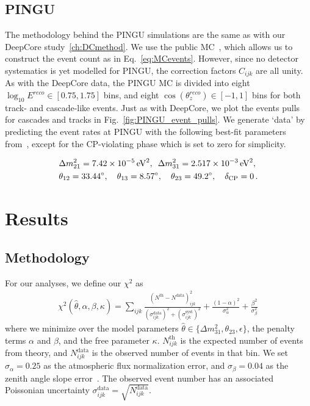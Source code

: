 \documentclass[draft=True]{revtex4-2}
\newcommand{\zreco}{\ensuremath{\cos{(\theta_z^{reco})}}}
\newcommand{\dm}{\Delta m^2_{31}}
\begin{document}
\subsection{PINGU}\label{ch:PINGUmethod}
The methodology behind the PINGU simulations are the same as with our DeepCore study~\ref{ch:DCmethod}. We use the public MC~\cite{PINGUdata}, which allows us to construct the event count as in Eq.~\ref{eq:MCevents}.
However, since no detector systematics is yet modelled for PINGU, the correction factors $C_{ijk}$ are all unity.
As with the DeepCore data, the PINGU MC is divided into eight 
$\log_{10}E^{reco} \in [0.75,1.75]$ bins, and eight $\zreco \in [-1,1]$ bins for both track- and cascade-like events. Just as with DeepCore, 
we plot the events pulls for cascades and tracks in Fig.~\ref{fig:PINGU_event_pulls}. %
We generate `data' by predicting the event rates at PINGU with the following best-fit parameters from~\cite{nufit}, except for the CP-violating phase which is set to zero for simplicity.

\begin{align}\label{eq:PINGUparams}
    &\Delta m^2_{21} =  \SI{7.42e-5}{\electronvolt^2},\hspace{0.5em} \dm =  \SI{2.517e-3}{\electronvolt^2}, \nonumber \\
    &\theta_{12} = \SI{33.44}{\degree},\hspace{1em} \theta_{13} = \SI{8.57}{\degree},\hspace{1em} \theta_{23} = \SI{49.2}{\degree}, \hspace{1em} \delta_\text{CP} = 0\,.
\end{align}


\section{Results}
\subsection{Methodology}
For our analyses, we define our $\chi^2$ as
\begin{align} \label{eq:chisq}
    \chi^{2}(\hat{\theta},\alpha,\beta, \kappa)=\sum_{ijk} \frac{\left(N^\text{th}-N^\text{data}\right)_{ijk}^{2}}
    {\left(\sigma^\text{data}_{ijk}\right)^{2} + \left(\sigma^\text{syst}_{ijk}\right)^{2}}+ 
    \frac{(1-\alpha)^2}{\sigma_\alpha^2} + \frac{\beta^2}{\sigma_\beta^2}\,
\end{align}
where we minimize over the model parameters $\hat{\theta} \in \{\dm, \theta_{23}, \epsilon\}$, the penalty terms $\alpha$ and $\beta$, and the free parameter $\kappa$.
$N_{ijk}^\text{th}$ is the expected number of events from theory, and $N_{ijk}^\text{data}$ is the observed number of events in that bin. We set $\sigma_\alpha = 0.25$ as the atmospheric flux normalization error, and $\sigma_\beta = 0.04$ as the zenith angle slope error~\cite{hondapaper}. 
The observed event number has an associated Poissonian uncertainty $\sigma_{ijk}^\text{data} = \sqrt{N_{ijk}^\text{data}}$.
\end{document}

